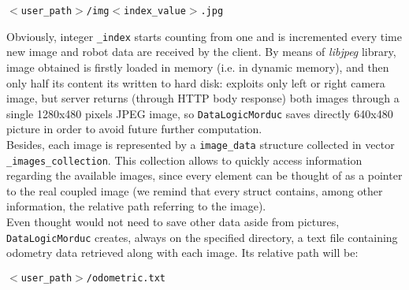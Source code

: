 \begin{center}
  \texttt{$<$user\_path$>$/img$<$index\_value$>$.jpg}
\end{center}

Obviously, integer \texttt{\_index} starts counting from one and is
incremented every time new image and robot data are received by the
client. By means of \textit{libjpeg} library, image obtained is
firstly loaded in memory (i.e. in dynamic memory), and then only half
its content its written to hard disk: \framework{} exploits only
left or right camera image, but server returns (through HTTP body
response) both images through a single 1280x480 pixels JPEG image,
so \texttt{DataLogicMorduc} saves directly 640x480 picture in order
to avoid future further computation.
\\
Besides, each image is represented by a \texttt{image\_data}
structure collected in vector \texttt{\_images\_collection}. This
collection allows to quickly access information regarding the
available images, since every element can be thought of as a pointer
to the real coupled image (we remind that every struct contains, among
other information, the relative path referring to the image).
\\
Even thought \framework{} would not need to save other data aside
from pictures, \texttt{DataLogicMorduc} creates, always on
the specified directory, a text file containing odometry data retrieved
along with each image. Its relative path will be:

\begin{center}
  \texttt{$<$user\_path$>$/odometric.txt}
\end{center}

